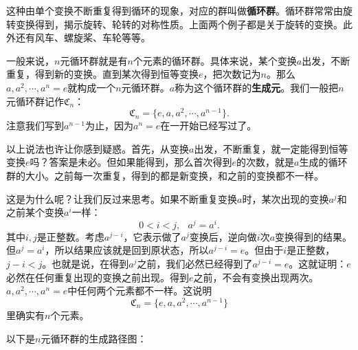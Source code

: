 \documentclass[12pt,UTF8,fontset=none]{ctexbook}
\begin{document}
这种由单个变换不断重复得到循环的现象，对应的群叫做\textbf{循环群}。循环群常常由旋转变换得到，揭示旋转、轮转的对称性质。上面两个例子都是关于旋转的变换。此外还有风车、螺旋桨、车轮等等。

一般来说，$n$元循环群就是有$n$个元素的循环群。具体来说，某个变换$a$出发，不断重复，得到新的变换。直到某次得到恒等变换$e$，把次数记为$n$。那么$a, a^2, \cdots, a^n=e$就构成一个$n$元循环群。$a$称为这个循环群的\textbf{生成元}。我们一般把$n$元循环群记作$\mathfrak{C}_n$：
$$ \mathfrak{C}_n = \{e, a, a^2, \cdots, a^{n-1}\}.$$
注意我们写到$a^{n-1}$为止，因为$a^n = e$在一开始已经写过了。

以上说法也许让你感到疑惑。首先，从变换$a$出发，不断重复，就一定能得到恒等变换$e$吗？答案是未必。但如果能得到，那么首次得到$e$的次数，就是$a$生成的循环群的大小。之前每一次重复，得到的都是新变换，和之前的变换都不一样。

这是为什么呢？让我们反过来思考。如果不断重复变换$a$时，某次出现的变换$a^j$和之前某个变换$a^i$一样：
$$ 0 < i < j, \,\;\; a^j = a^i.$$
其中$i,j$是正整数。考虑$a^{j-i}$，它表示做了$a^j$变换后，逆向做$i$次$a$变换得到的结果。但$a^j = a^i$，所以结果应该就是回到原状态，所以$a^{j-i} = e$。但由于$i$是正整数，$j-i<j$。也就是说，在得到$a^j$之前，我们必然已经得到了$a^{j-i} = e$。这就证明：$e$必然在任何重复出现的变换之前出现。得到$e$之前，不会有变换出现两次。$a,a^2,\cdots, a^n=e$中任何两个元素都不一样。这说明
$$ \mathfrak{C}_n = \{e, a, a^2, \cdots, a^{n-1}\}$$
里确实有$n$个元素。

以下是$n$元循环群的生成路径图：
\end{document}
